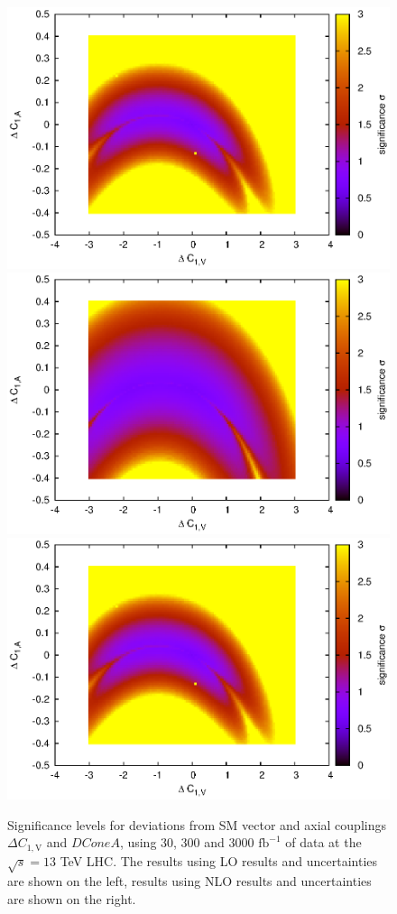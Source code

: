 \documentclass[preprint]{JHEP3} %
\def\invfb {\mathrm{fb}^{-1}}
\def\DConeV{\Delta C_{1,\mathrm{V}}}
\begin{document}
\begin{figure}[t]
\includegraphics[scale=0.6]{BLLNLO1223sig_SUA2_300_1.15.eps} 
\\
\includegraphics[scale=0.6]{BLLLO1223HSsig_SUA2_300_1.30.eps} 
\includegraphics[scale=0.6]{BLLNLO1223sig_SUA2_300_1.15.eps} 
\caption{\label{fig:viii} Significance levels for deviations from SM vector and axial couplings $\DConeV$ and $DConeA$,  using 30, 300 and 3000 $\invfb$ of data at the $\sqrt{s}=13$ TeV LHC. 
The results using LO results and uncertainties are shown on the left, results using NLO results and uncertainties are shown on the right.}
\end{figure}
\end{document}
